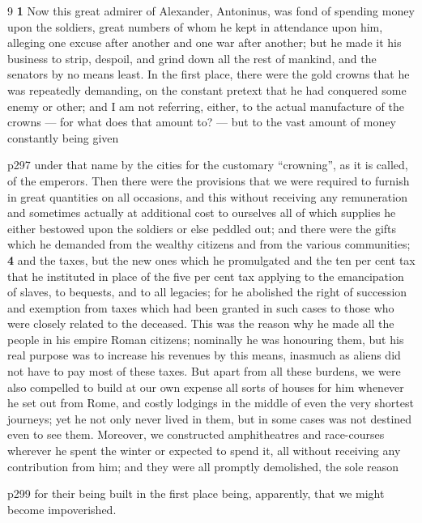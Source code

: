 9 \textbf{1} Now this great admirer of Alexander, Antoninus, was fond of spending money upon the soldiers, great numbers of whom he kept in attendance upon him, alleging one excuse after another and one war after another; but he made it his business to strip, despoil, and grind down all the rest of mankind, and the senators by no means least. In the first place, there were the gold crowns that he was repeatedly demanding, on the constant pretext that he had conquered some enemy or other; and I am not referring, either, to the actual manufacture of the crowns \texthebrew{—} for what does that amount to? \texthebrew{—} but to the vast amount of money constantly being given

p297 under that name by the cities for the customary ``crowning'', as it is called, of the emperors. Then there were the provisions that we were required to furnish in great quantities on all occasions, and this without receiving any remuneration and sometimes actually at additional cost to ourselves all of which supplies he either bestowed upon the soldiers or else peddled out; and there were the gifts which he demanded from the wealthy citizens and from the various communities; \textbf{4} and the taxes, but the new ones which he promulgated and the ten per cent tax that he instituted in place of the five per cent tax applying to the emancipation of slaves, to bequests, and to all legacies; for he abolished the right of succession and exemption from taxes which had been granted in such cases to those who were closely related to the deceased. This was the reason why he made all the people in his empire Roman citizens; nominally he was honouring them, but his real purpose was to increase his revenues by this means, inasmuch as aliens did not have to pay most of these taxes. But apart from all these burdens, we were also compelled to build at our own expense all sorts of houses for him whenever he set out from Rome, and costly lodgings in the middle of even the very shortest journeys; yet he not only never lived in them, but in some cases was not destined even to see them. Moreover, we constructed amphitheatres and race-courses wherever he spent the winter or expected to spend it, all without receiving any contribution from him; and they were all promptly demolished, the sole reason

p299 for their being built in the first place being, apparently, that we might become impoverished.

